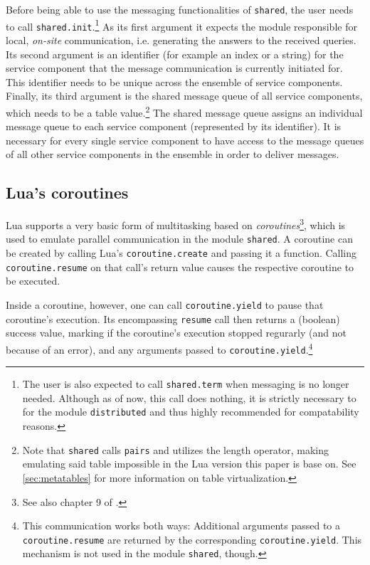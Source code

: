 \pagebreak

Before being able to use the messaging functionalities of \texttt{shared}, the user needs to call \texttt{shared.init}.\footnote{The user is also expected to call \texttt{shared.term} when messaging is no longer needed. Although as of now, this call does nothing, it is strictly necessary to for the module \texttt{distributed} and thus highly recommended for compatability reasons.} As its first argument it expects the module responsible for local, \emph{on-site} communication, i.e. generating the answers to the received queries. Its second argument is an identifier (for example an index or a string) for the service component that the message communication is currently initiated for. This identifier needs to be unique across the ensemble of service components. Finally, its third argument is the shared message queue of all service components, which needs to be a table value.\footnote{Note that \texttt{shared} calls \texttt{pairs} and utilizes the length operator, making emulating said table impossible in the Lua version this paper is base on. See \ref{sec:metatables} for more information on table virtualization.} The shared message queue assigns an individual message queue to each service component (represented by its identifier). It is necessary for every single service component to have access to the message queues of all other service components in the ensemble in order to deliver messages.

\begin{comment}
Include crossreference to POEM
\end{comment}

\subsection{Lua's coroutines}

Lua supports a very basic form of multitasking based on \emph{coroutines}\footnote{See also chapter 9 of \cite{Ierusalimschy2006}.}, which is used to emulate parallel communication in the module \texttt{shared}. A coroutine can be created by calling Lua's \texttt{coroutine.create} and passing it a function. Calling \texttt{coroutine.resume} on that call's return value causes the respective coroutine to be executed.

Inside a coroutine, however, one can call \texttt{coroutine.yield} to pause that coroutine's execution. Its encompassing \texttt{resume} call then returns a (boolean) success value, marking if the coroutine's execution stopped regurarly (and not because of an error), and any arguments passed to \texttt{coroutine.yield}.\footnote{This communication works both ways: Additional arguments passed to a \texttt{coroutine.resume} are returned by the corresponding \texttt{coroutine.yield}. This mechanism is not used in the module \texttt{shared}, though.}

